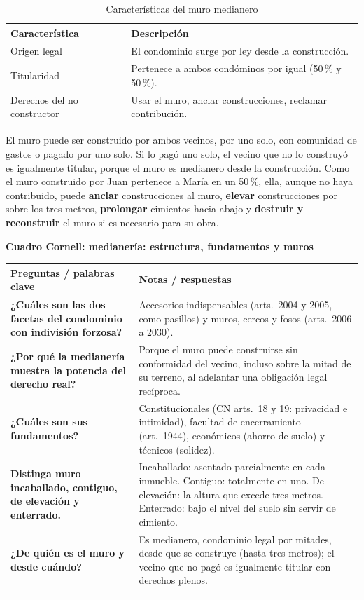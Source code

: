 \documentclass[12pt,oneside]{book}
\renewcommand{\arraystretch}{1.25}
\newcommand{\cq}[2]{\textbf{#1} & #2 \\[0.45em]}
\newcommand{\cornell}[3]{%
\par\bigskip\noindent\textbf{\large Cuadro Cornell: #1}\par\smallskip
\begin{center}
\small
\renewcommand{\arraystretch}{1.15}
\begin{tabularx}{\textwidth}{>{\raggedright\arraybackslash}p{0.27\textwidth}>{\raggedright\arraybackslash}X}
\toprule
\textbf{Preguntas / palabras clave} & \textbf{Notas / respuestas} \\
\midrule
#2
\midrule
\multicolumn{2}{p{\dimexpr\textwidth-2\tabcolsep\relax}}{\textbf{Resumen.} #3} \\
\bottomrule
\end{tabularx}
\end{center}
}
\begin{document}
\begin{table}[H]
\centering
\small
\begin{tabularx}{\textwidth}{>{\raggedright\arraybackslash}p{}>{\raggedright\arraybackslash}X}
\toprule
\textbf{Característica} & \textbf{Descripción} \\
\midrule
Origen legal & El condominio surge por ley desde la construcción. \\
Titularidad & Pertenece a ambos condóminos por igual (50\,\% y 50\,\%). \\
Derechos del no constructor & Usar el muro, anclar construcciones, reclamar contribución. \\
\bottomrule
\end{tabularx}
\caption{Características del muro medianero}
\end{table}

El muro puede ser construido por ambos vecinos, por uno solo, con comunidad de gastos o pagado por uno solo. %
Si lo pagó uno solo, el vecino que no lo construyó es igualmente titular, porque el muro es medianero desde la construcción. Como el muro construido por Juan pertenece a María en un 50\,\%, ella, aunque no haya contribuido, puede \textbf{anclar} construcciones al muro, \textbf{elevar} construcciones por sobre los tres metros, \textbf{prolongar} cimientos hacia abajo y \textbf{destruir y reconstruir} el muro si es necesario para su obra.

\cornell{medianería: estructura, fundamentos y muros}{
\cq{¿Cuáles son las dos facetas del condominio con indivisión forzosa?}{Accesorios indispensables (arts.~2004 y 2005, como pasillos) y muros, cercos y fosos (arts.~2006 a 2030).}
\cq{¿Por qué la medianería muestra la potencia del derecho real?}{Porque el muro puede construirse sin conformidad del vecino, incluso sobre la mitad de su terreno, al adelantar una obligación legal recíproca.}
\cq{¿Cuáles son sus fundamentos?}{Constitucionales (CN arts.~18 y 19: privacidad e intimidad), facultad de encerramiento (art.~1944), económicos (ahorro de suelo) y técnicos (solidez).}
\cq{Distinga muro incaballado, contiguo, de elevación y enterrado.}{Incaballado: asentado parcialmente en cada inmueble. Contiguo: totalmente en uno. De elevación: la altura que excede tres metros. Enterrado: bajo el nivel del suelo sin servir de cimiento.}
\cq{¿De quién es el muro y desde cuándo?}{Es medianero, condominio legal por mitades, desde que se construye (hasta tres metros); el vecino que no pagó es igualmente titular con derechos plenos.}
}{La medianería impone a los propietarios colindantes el derecho y la obligación recíprocos de cerramiento, fundada en la privacidad, la economía de suelo y la solidez. Los muros se clasifican por su ubicación y por su titularidad; el muro nace medianero desde su construcción.}
\end{document}
